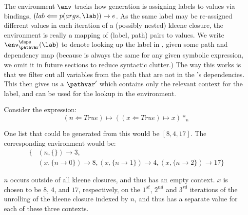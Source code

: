 The environment $\env$ tracks how generation is assigning labels to values via bindings,
$(lab \Longleftarrow p(args, \lab)) \mapsto e$.
As the same label may be re-assigned different values in each iteration of a
(possibly nested) kleene closure,
the environment is really a mapping of (label, path) pairs to values.
We write $\env^\deps_\pathvar(\lab)$
to denote looking up the label \lab in \env,
given some path and dependency map
(because \deps is always the same for any given symbolic expression,
we omit it in future sections to reduce syntactic clutter.)
The way this works is that
we filter out all variables from
the path that are not in the \lab's dependencies.
This then gives us a $\pathvar'$ which contains only the
relevant context for the label,
and can be used for the lookup in the environment.

\begin{example}
Consider the expression:
\[
(n \Longleftarrow \mathit{True}) \mapsto ((x \Longleftarrow \mathit{True}) \mapsto x)*_n
\]

One list that could be generated from this would be $[8, 4, 17]$.
The corresponding environment would be:
\begin{align*}
    \{  &(n, \{\}) \rightarrow 3, \\
        &(x, \{ n \rightarrow 0 \}) \rightarrow 8, (x, \{ n \rightarrow 1 \}) \rightarrow 4, (x, \{ n \rightarrow 2 \}) \rightarrow 17 \}
\end{align*}

$n$ occurs outside of all kleene closures, and thus has an empty context.
$x$ is chosen to be $8$, $4$, and $17$, respectively,
on the $1^{st}$, $2^{nd}$ and $3^{rd}$ iterations of the unrolling of the kleene closure indexed by $n$,
and thus has a separate value for each of these three contexts.
\end{example}

